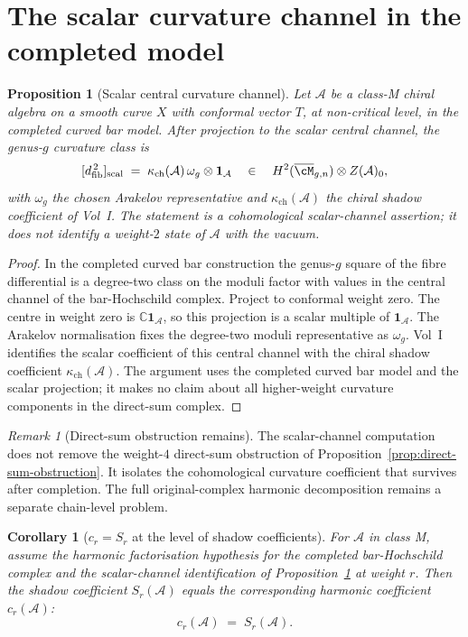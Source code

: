 \documentclass[11pt]{amsart}
\newtheorem{proposition}[theorem]{Proposition}
\newtheorem{corollary}[theorem]{Corollary}
\theoremstyle{definition}
\theoremstyle{remark}
\newtheorem{remark}[theorem]{Remark}
\providecommand{\cA}{\mathcal{A}}
\begin{document}
\section{The scalar curvature channel in the completed model}
\label{sec:direct-sum-obstruction-resolution}

\begin{proposition}[Scalar central curvature channel]%
\label{prop:direct-sum-obstruction-resolution}%
Let $\cA$ be a class-M chiral algebra on a smooth curve $X$ with
conformal vector $T$, at non-critical level, in the completed curved
bar model. After projection to the scalar central channel, the
genus-$g$ curvature class is
\[
  [d_{\mathrm{fib}}^{\,2}]_{\mathrm{scal}}
  \;=\;
  \kappa_{\mathrm{ch}}(\cA)\,\omega_g \otimes \mathbf{1}_{\cA}
  \quad\in\quad
  H^2(\overline{\cM}_{g,n})\otimes Z(\cA)_0 ,
\]
with $\omega_g$ the chosen Arakelov representative and
$\kappa_{\mathrm{ch}}(\cA)$ the chiral shadow coefficient of Vol~I.
The statement is a cohomological scalar-channel assertion; it does
not identify a weight-$2$ state of $\cA$ with the vacuum.
\end{proposition}

\begin{proof}
In the completed curved bar construction the genus-$g$ square of the
fibre differential is a degree-two class on the moduli factor with
values in the central channel of the bar-Hochschild complex. Project
to conformal weight zero. The centre in weight zero is
$\mathbb{C}\mathbf{1}_{\cA}$, so this projection is a scalar multiple
of $\mathbf{1}_{\cA}$. The Arakelov normalisation fixes the degree-two
moduli representative as $\omega_g$. Vol~I identifies the scalar
coefficient of this central channel with the chiral shadow coefficient
$\kappa_{\mathrm{ch}}(\cA)$. The argument uses the completed curved
bar model and the scalar projection; it makes no claim about all
higher-weight curvature components in the direct-sum complex.
\end{proof}

\begin{remark}[Direct-sum obstruction remains]
The scalar-channel computation does not remove the weight-$4$
direct-sum obstruction of
Proposition~\ref{prop:direct-sum-obstruction}. It isolates the
cohomological curvature coefficient that survives after completion.
The full original-complex harmonic decomposition remains a separate
chain-level problem.
\end{remark}

\begin{corollary}[$c_r = S_r$ at the level of shadow coefficients]%
\label{cor:cr-equals-Sr}%
For $\cA$ in class M, assume the harmonic factorisation hypothesis for
the completed bar-Hochschild complex and the scalar-channel
identification of
Proposition~\ref{prop:direct-sum-obstruction-resolution} at weight
$r$. Then the shadow coefficient $S_r(\cA)$ equals the corresponding
harmonic coefficient $c_r(\cA)$:
\[
  c_r(\cA) \;=\; S_r(\cA).
\]
\end{corollary}
\end{document}
